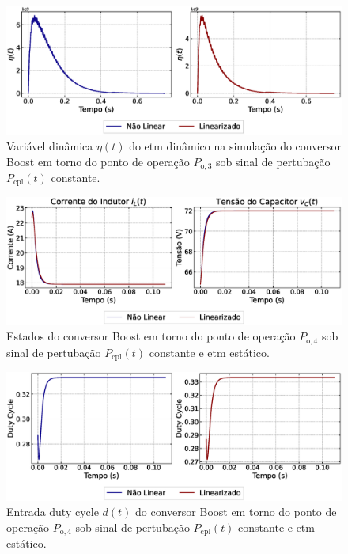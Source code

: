 \begin{figure}[H]
  \centering
  \captionsetup{justification=centering}
  \includegraphics[width=1.\textwidth]{figuras/dynamic-etm/boost/sim1/op1/eta.eps}
  \caption{Variável dinâmica $\eta(t)$ do \acrshort{etm} dinâmico na simulação do conversor Boost em torno do ponto de operação $P_{\mathrm{o}, 3}$ sob sinal de pertubação $P_{\mathrm{cpl}}(t)$ constante.}
\end{figure}

\begin{figure}[H]
  \centering
  \captionsetup{justification=centering}
  \includegraphics[width=1.\textwidth]{figuras/dynamic-etm/boost/sim1/op2/result.eps}
  \caption{Estados do conversor Boost em torno do ponto de operação $P_{\mathrm{o}, 4}$ sob sinal de pertubação $P_{\mathrm{cpl}}(t)$ constante e \acrshort{etm} estático.}
\end{figure}

\begin{figure}[H]
  \centering
  \captionsetup{justification=centering}
  \includegraphics[width=1.\textwidth]{figuras/dynamic-etm/boost/sim1/op2/duty-cycle.eps}
  \caption{Entrada duty cycle $d(t)$ do conversor Boost em torno do ponto de operação $P_{\mathrm{o}, 4}$ sob sinal de pertubação $P_{\mathrm{cpl}}(t)$ constante e \acrshort{etm} estático.}
\end{figure}

